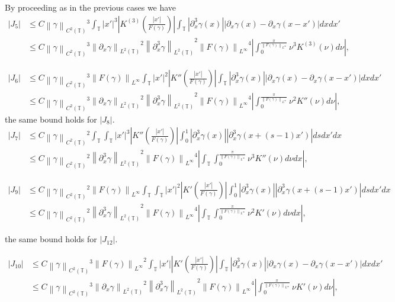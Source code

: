 \documentclass[a4paper]{amsart}
\theoremstyle{definition}
\newcommand{\T}{\ensuremath{\mathbb{T}}}
\newcommand{\Np}[2][\infty]{\ensuremath{\left\|#2\right\|_{L^#1}}}
\newcommand{\Lp}[2][2]{\ensuremath{\left\|#2\right\|_{L^#1(\T)}}}
\newcommand{\Ck}[2][2]{\ensuremath{\left\|#2\right\|_{C^#1(\T)}}}
\begin{document}
    By proceeding as in the previous cases we have
    \begin{align*}
        |J_5|&\leq C \Ck{\gamma}^3 \int_\T |x'|^3\left| K^{(3)}\left( \frac{|x'|}{F(\gamma)}\right) \right| \int_\T |\partial_x^3\gamma(x)||\partial_x\gamma(x)-\partial_x\gamma(x-x')| dxdx'\\
        &\leq C \Ck{\gamma}^3 \Lp{\partial_x\gamma }^2\Lp{\partial_x^3\gamma }^2\Np{F(\gamma)}^4 \left|\int_0^{\frac{\pi}{\Np{F(\gamma)}}} \nu^3 K^{(3)}(\nu) d\nu \right|, 
    \end{align*}

    \begin{align*}
        |J_6|&\leq C \Ck{\gamma}^3 \Np{F(\gamma)}\int_\T |x'|^2\left| K''\left( \frac{|x'|}{F(\gamma)}\right) \right| \int_\T |\partial_x^3\gamma(x)||\partial_x\gamma(x)-\partial_x\gamma(x-x')| dxdx'\\
        &\leq C \Ck{\gamma}^3 \Lp{\partial_x\gamma }^2\Lp{\partial_x^3\gamma }^2\Np{F(\gamma)}^4 \left|\int_0^{\frac{\pi}{\Np{F(\gamma)}}} \nu^2 K''(\nu) d\nu \right|, 
    \end{align*}
    the same bound holds for $|J_8|$.
    \begin{align*}
        |J_7|&\leq C \Ck{\gamma}^2 \int_\T\int_\T |x'|^3\left|K''\left(\frac{|x'|}{F(\gamma)}\right)\right| \int_0^1 |\partial_x^3\gamma(x)||\partial_x^3\gamma(x+(s-1)x')|dsdx'dx\\
        &\leq C \Ck{\gamma}^2 \Lp{\partial_x^3\gamma}^2\Np{F(\gamma)}^4 \left|\int_\T\int_0^{\frac{\pi}{\Np{F(\gamma)}}} \nu^3 K''(\nu) d\nu dx \right|,
    \end{align*}

     \begin{align*}
        |J_9|&\leq C \Ck{\gamma}^2 \Np{F(\gamma)} \int_\T\int_\T |x'|^2\left|K'\left(\frac{|x'|}{F(\gamma)}\right)\right| \int_0^1 |\partial_x^3\gamma(x)||\partial_x^3\gamma(x+(s-1)x')|dsdx'dx\\
        &\leq C \Ck{\gamma}^2 \Lp{\partial_x^3\gamma}^2\Np{F(\gamma)}^4 \left|\int_\T\int_0^{\frac{\pi}{\Np{F(\gamma)}}} \nu^2 K'(\nu) d\nu dx \right|,
    \end{align*}

    the same bound holds for $|J_{12}|.$

    \begin{align*}
        |J_{10}|&\leq C \Ck{\gamma}^3 \Np{F(\gamma)}^2\int_\T |x'|\left| K'\left( \frac{|x'|}{F(\gamma)}\right) \right|  \int_\T |\partial_x^3\gamma(x)||\partial_x\gamma(x)-\partial_x\gamma(x-x')| dxdx'\\
        &\leq C \Ck{\gamma}^3 \Lp{\partial_x\gamma }^2\Lp{\partial_x^3\gamma }^2\Np{F(\gamma)}^4 \left|\int_0^{\frac{\pi}{\Np{F(\gamma)}}} \nu K'(\nu) d\nu \right|, 
    \end{align*}
\end{document}
